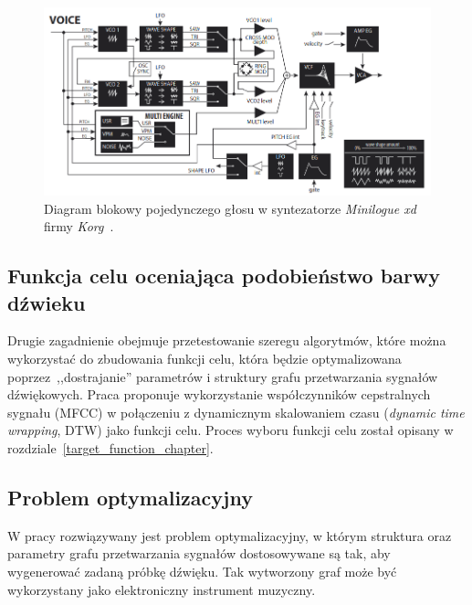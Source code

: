 \begin{figure}[H]
    \centering
    \includegraphics[width=0.8\linewidth]{rys01/minilogue_voice_block_diagram.png}
    \caption{
      Diagram blokowy pojedynczego głosu w syntezatorze 
      \textit{Minilogue xd} firmy \textit{Korg}~\cite{minilogue_diagram}.
    }\label{fig:minilogue_diagram}
\end{figure}

\subsection{Funkcja celu oceniająca podobieństwo barwy dźwieku}

Drugie zagadnienie obejmuje przetestowanie szeregu algorytmów, które można
wykorzystać do zbudowania funkcji celu, która będzie optymalizowana
poprzez~,,dostrajanie'' parametrów i struktury grafu przetwarzania sygnałów dźwiękowych.
Praca proponuje wykorzystanie współczynników cepstralnych sygnału (MFCC) w połączeniu
z dynamicznym skalowaniem czasu (\textit{dynamic time wrapping}, DTW) jako funkcji celu.
Proces wyboru funkcji celu został
opisany w rozdziale~\ref{target_function_chapter}.

\subsection{Problem optymalizacyjny}

W pracy rozwiązywany jest problem optymalizacyjny, w którym
struktura oraz parametry grafu przetwarzania sygnałów dostosowywane
są tak, aby wygenerować zadaną próbkę dźwięku. Tak wytworzony
graf może być wykorzystany jako elektroniczny instrument muzyczny. 





